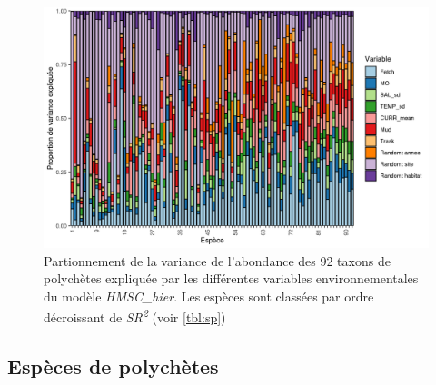 \documentclass[12pt,]{article}
\makeatletter
\def\maxwidth{\ifdim\Gin@nat@width>\linewidth\linewidth
\else\Gin@nat@width\fi}
\let\Oldincludegraphics\includegraphics
\renewcommand{\includegraphics}[1]{\Oldincludegraphics[width=\maxwidth]{#1}}
\makeatother
\begin{document}
\begin{figure}
\hypertarget{fig:varparthier}{%
\centering
\includegraphics{figures/VP-HMSC-Var-Part-plot-3.png}
\caption{Partionnement de la variance de l'abondance des 92 taxons de
polychètes expliquée par les différentes variables environnementales du
modèle \emph{HMSC\_hier}. Les espèces sont classées par ordre
décroissant de \emph{SR\textsuperscript{2}} (voir
\cref{tbl:sp})}\label{fig:varparthier}
}
\end{figure}

\hypertarget{espuxe8ces-de-polychuxe8tes}{%
\subsection{Espèces de polychètes}\label{espuxe8ces-de-polychuxe8tes}}
\end{document}
